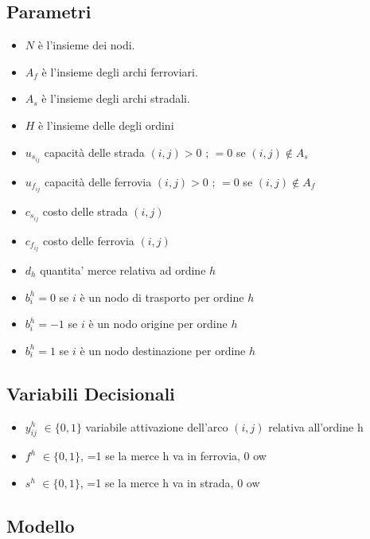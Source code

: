 \documentclass{article}
\begin{document}
\subsection{Parametri}
\begin{itemize}
    \item \textbf{$N$} è l'insieme dei nodi.
    \item \textbf{$A_f$} è l'insieme degli archi ferroviari.
    \item \textbf{$A_s$} è l'insieme degli archi stradali.
    \item \textbf{$H$} è l'insieme delle degli ordini
    \item $u_{s_{ij}}$ capacità delle strada $(i,j) > 0$ ; $=0$ se $(i,j) \not\in A_s $ 
    \item $u_{f_{ij}}$ capacità delle ferrovia $(i,j) > 0$ ; $=0$ se $(i,j) \not\in A_f $ 
    \item $c_{s_{ij}}$ costo delle strada $(i,j)$
    \item $c_{f_{ij}}$ costo delle ferrovia $(i,j)$
    \item $d_h$ quantita' merce relativa ad ordine $h$
\end{itemize}

\begin{itemize}
    \item $b_i^h = 0$ se $i$ è un nodo di trasporto per ordine $h$
    \item  $b_i^h =-1$ se $i$ è un nodo origine per ordine $h$
    \item $b_i^h =1$ se $i$ è un nodo destinazione per ordine $h$
\end{itemize}

\subsection{Variabili Decisionali}
\begin{itemize}
    \item $y_{ij}^h$ $\in \{0,1\}$ variabile attivazione dell'arco $(i,j)$ relativa all'ordine h
    \item $f^h$ $\in \{0,1\}$, =1 se la merce h va in ferrovia, 0 ow
    \item $s^h$ $\in \{0,1\}$, =1 se la merce h va in strada, 0 ow
\end{itemize}

\subsection{Modello}
\end{document}

